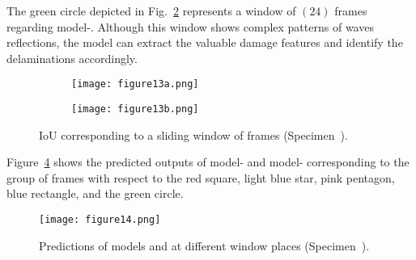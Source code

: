 The green circle depicted in Fig.~\ref{fig:L3_S4_B_333x333p_50kHz_5HC_shapes_} represents a window of \((24)\) frames regarding model-.
Although this window shows complex patterns of waves reflections, the model can extract the valuable damage features and identify the delaminations accordingly.
\begin{figure} [!h]
	\centering
	\begin{subfigure}[b]{1\textwidth}
		\centering
		\texttt{[image: figure13a.png]}
		\caption{}
		\label{fig:L3_S4_B_333x333p_50kHz_5HC_IoU}
	\end{subfigure}
	\par\medskip
	\begin{subfigure}[b]{1\textwidth}
		\centering
		\texttt{[image: figure13b.png]}
		\caption{} 
		\label{fig:L3_S4_B_333x333p_50kHz_5HC_shapes_}
	\end{subfigure}
	\caption{IoU corresponding to a sliding window of frames (Specimen~).}
	\label{fig:L3_S4_B_333x333p_50kHz_5HC_IoU_centre_window}
\end{figure} 

Figure~\ref{fig:L3_S4_B_5HC_predictions} shows the predicted outputs of model- and model- corresponding to the group of frames with respect to the red square, light blue star, pink pentagon, blue rectangle, and the green circle. 
\begin{figure}[!h]
	\centering
	\texttt{[image: figure14.png]}
	\caption{Predictions of models  and  at different window places (Specimen~).}
	\label{fig:L3_S4_B_5HC_predictions}
\end{figure}

